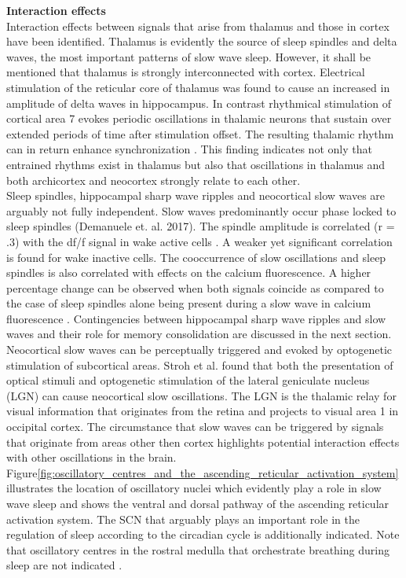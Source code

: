 \textbf{Interaction effects}\\
Interaction effects between signals that arise from thalamus and those in cortex have been identified. Thalamus is evidently the source of sleep spindles and delta waves, the most important patterns of slow wave sleep. However, it shall be mentioned that thalamus is strongly interconnected with cortex. Electrical stimulation of the reticular core of thalamus was found to cause an increased in amplitude of delta waves in hippocampus. In contrast rhythmical stimulation of cortical area 7 evokes periodic oscillations in thalamic neurons that sustain over extended periods of time after stimulation offset. The resulting thalamic rhythm can in return enhance synchronization \parencite[p. 21]{steriade1984thalamus}. This finding indicates not only that entrained rhythms exist in thalamus but also that oscillations in thalamus and both archicortex and neocortex strongly relate to each other.\\
Sleep spindles, hippocampal sharp wave ripples and neocortical slow waves are arguably not fully independent. Slow waves predominantly occur phase locked to sleep spindles (Demanuele et. al. 2017). The spindle amplitude is correlated (r = .3) with the df/f signal in wake active cells \parencite{niethard2018cortical}. A weaker yet significant correlation is found for wake inactive cells. The cooccurrence of slow oscillations and sleep spindles is also correlated with effects on the calcium fluorescence. A higher percentage change can be observed when both signals coincide as compared to the case of sleep spindles alone being present during a slow wave in calcium fluorescence \parencite{niethard2018cortical}. Contingencies between hippocampal sharp wave ripples and slow waves and their role for memory consolidation are discussed in the next section.\\
Neocortical slow waves can be perceptually triggered and evoked by optogenetic stimulation of subcortical areas. Stroh et al. \parencite*{stroh2013making} found that both the presentation of optical stimuli and optogenetic stimulation of the lateral geniculate nucleus (LGN) can cause neocortical slow oscillations. The LGN is the thalamic relay for visual information that originates from the retina and projects to visual area 1 in occipital cortex. The circumstance that slow waves can be triggered by signals that originate from areas other then cortex highlights potential interaction effects with other oscillations in the brain.\\
Figure\ref{fig:oscillatory_centres_and_the_ascending_reticular_activation_system} illustrates the location of oscillatory nuclei which evidently play a role in slow wave sleep and shows the ventral and dorsal pathway of the ascending reticular activation system. The SCN that arguably plays an important role in the regulation of sleep according to the circadian cycle is additionally indicated. Note that oscillatory centres in the rostral medulla that orchestrate breathing during sleep are not indicated \parencite{kubin2019interactions}.\\
